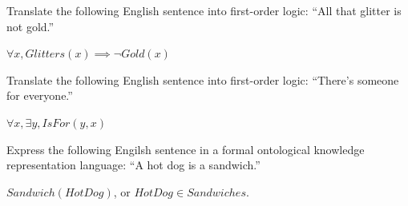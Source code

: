 \begin{questions}

\question Translate the following English sentence into first-order logic: ``All that glitter is not gold.''

\begin{solution}[.75in]
$\forall x, Glitters(x) \implies \neg Gold(x)$
\end{solution}

\question Translate the following English sentence into first-order logic: ``There's someone for everyone.''

\begin{solution}[.75in]
$\forall x, \exists y, IsFor(y, x)$
\end{solution}

\question Express the following Engilsh sentence in a formal ontological knowledge representation language: ``A hot dog is a sandwich.''

\begin{solution}[.75in]
$Sandwich(HotDog)$, or $HotDog \in Sandwiches$.
\end{solution}

\end{questions}


